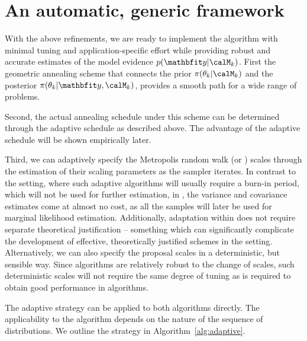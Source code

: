 \section{An automatic, generic framework}
\label{sec:An automatic, generic framework}

With the above refinements, we are ready to implement the \smc[2] algorithm
with minimal tuning and application-specific effort while providing robust and
accurate estimates of the model evidence $p(\data|\calM_k)$. First the
geometric annealing scheme that connects the prior $\pi(\theta_k|\calM_k)$ and
the posterior $\pi(\theta_k|\data,\calM_k)$, provides a smooth path for a wide
range of problems.

Second, the actual annealing schedule under this scheme can be determined
through the adaptive schedule as described above. The advantage of the
adaptive schedule will be shown empirically later.

Third, we can adaptively specify the Metropolis random walk (or \mala) scales
through the estimation of their scaling parameters as the sampler iterates. In
contrast to the \mcmc setting, where such adaptive algorithms will usually
require a burn-in period, which will not be used for further estimation, in
\smc, the variance and covariance estimates come at almost no cost, as all the
samples will later be used for marginal likelihood estimation. Additionally,
adaptation within \smc does not require separate theoretical justification --
something which can significantly complicate the development of effective,
theoretically justified schemes in the \mcmc setting. Alternatively, we can
also specify the proposal scales in a deterministic, but sensible way. Since
\smc algorithms are relatively robust to the change of scales, such
deterministic scales will not require the same degree of tuning as is required
to obtain good performance in \mcmc algorithms.

The adaptive strategy can be applied to both algorithms directly. The
applicability to the \smc[3] algorithm depends on the nature of the sequence
of distributions. We outline the strategy in Algorithm~\ref{alg:adaptive}.

